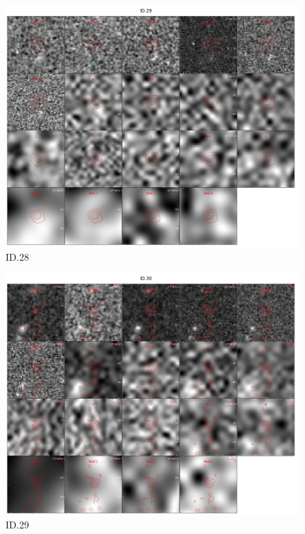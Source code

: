 \begin{figure}[tbp]
\centering \includegraphics[width=120mm]{Matched/ASPECS_Cutout_28.jpg}
\caption{ID.28}
\label{fig:Match_Three}
\end{figure}

\begin{figure}[tbp]
\centering \includegraphics[width=120mm]{Matched/ASPECS_Cutout_29.jpg}
\caption{ID.29}
\label{fig:Match_Three}
\end{figure}

